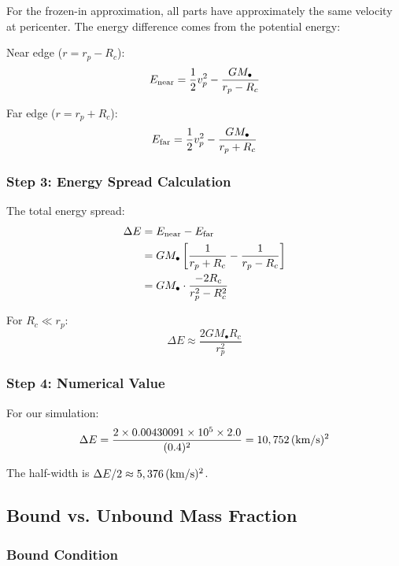 \documentclass[twocolumn,amsmath,amssymb,prd,superscriptaddress,nofootinbib]{revtex4-2}
\begin{document}
For the frozen-in approximation, all parts have approximately the same velocity at pericenter. The energy difference comes from the potential energy:

Near edge ($r = r_p - R_c$):
\begin{equation}
    E_{\rm near} = \frac{1}{2}v_p^2 - \frac{GM_\bullet}{r_p - R_c}
\end{equation}

Far edge ($r = r_p + R_c$):
\begin{equation}
    E_{\rm far} = \frac{1}{2}v_p^2 - \frac{GM_\bullet}{r_p + R_c}
\end{equation}

\subsubsection{Step 3: Energy Spread Calculation}

The total energy spread:
\begin{align}
    \Delta E &= E_{\rm near} - E_{\rm far} \\
    &= GM_\bullet\left[\frac{1}{r_p + R_c} - \frac{1}{r_p - R_c}\right] \\
    &= GM_\bullet \cdot \frac{-2R_c}{r_p^2 - R_c^2}
\end{align}

For $R_c \ll r_p$:
\begin{equation}
    \boxed{\Delta E \approx \frac{2GM_\bullet R_c}{r_p^2}}
    \label{eq:delta_E}
\end{equation}

\subsubsection{Step 4: Numerical Value}

For our simulation:
\begin{equation}
    \Delta E = \frac{2 \times 0.00430091 \times 10^5 \times 2.0}{(0.4)^2} = 10,752\,({\rm km/s})^2
\end{equation}

The half-width is $\Delta E/2 \approx 5,376\,({\rm km/s})^2$.

\subsection{Bound vs. Unbound Mass Fraction}
\label{sec:bound_fraction}

\subsubsection{Bound Condition}
\end{document}
